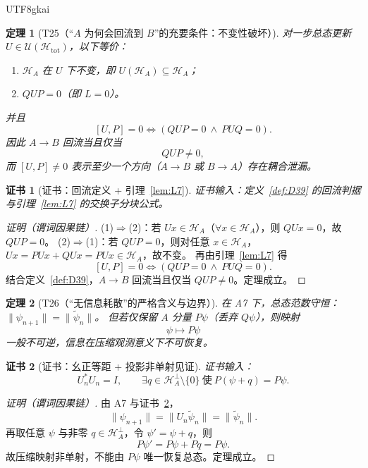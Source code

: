 \documentclass[12pt]{article}
\newtheorem{theorem}{定理}[section]
\newtheorem{Certificate}{证书}[section]
\begin{document}
\begin{CJK*}{UTF8}{gkai}
\begin{theorem}[T25（“$A$ 为何会回流到 $B$”的充要条件：不变性破坏）]
\label{thm:T25}
对一步总态更新 $U\in\mathcal U(\mathcal H_{\mathrm{tot}})$，以下等价：
\begin{enumerate}
\item $\mathcal H_A$ 在 $U$ 下不变，即 $U(\mathcal H_A)\subseteq \mathcal H_A$；
\item $QUP=0$（即 $L=0$）。
\end{enumerate}
并且
\[
[U,P]=0\Longleftrightarrow (QUP=0\ \wedge\ PUQ=0).
\]
因此 $A\to B$ 回流当且仅当
\[
QUP\neq 0,
\]
而 $[U,P]\neq 0$ 表示至少一个方向（$A\to B$ 或 $B\to A$）存在耦合泄漏。
\end{theorem}

\begin{Certificate}[证书：回流定义 + 引理~\ref{lem:L7}]
\label{cert:T25}
证书输入：定义~\ref{def:D39} 的回流判据与引理~\ref{lem:L7} 的交换子分块公式。
\end{Certificate}

\begin{proof}[证明（谓词因果链）]
(1)$\Rightarrow$(2)：若 $Ux\in\mathcal H_A$（$\forall x\in\mathcal H_A$），则 $QUx=0$，故 $QUP=0$。
(2)$\Rightarrow$(1)：若 $QUP=0$，则对任意 $x\in\mathcal H_A$，$Ux=PUx+QUx=PUx\in\mathcal H_A$，故不变。
再由引理~\ref{lem:L7} 得
\[
[U,P]=0\Longleftrightarrow (QUP=0\ \wedge\ PUQ=0).
\]
结合定义~\ref{def:D39}，$A\to B$ 回流当且仅当 $QUP\neq 0$。定理成立。
\end{proof}

\begin{theorem}[T26（“无信息耗散”的严格含义与边界）]
\label{thm:T26}
在 A7 下，总态范数守恒：$\|\psi_{n+1}\|=\|\tilde\psi_n\|$。
但若仅保留 $A$ 分量 $P\psi$（丢弃 $Q\psi$），则映射
\[
\psi\mapsto P\psi
\]
一般不可逆，信息在压缩观测意义下不可恢复。
\end{theorem}

\begin{Certificate}[证书：幺正等距 + 投影非单射见证]
\label{cert:T26}
证书输入：
\[
U_n^\ast U_n=I,\qquad
\exists q\in\mathcal H_A^\perp\setminus\{0\}\ \text{使}\ P(\psi+q)=P\psi.
\]
\end{Certificate}

\begin{proof}[证明（谓词因果链）]
由 A7 与证书~\ref{cert:T26}，
\[
\|\psi_{n+1}\|=\|U_n\tilde\psi_n\|=\|\tilde\psi_n\|.
\]
再取任意 $\psi$ 与非零 $q\in\mathcal H_A^\perp$，令 $\psi'=\psi+q$，则
\[
P\psi'=P\psi+Pq=P\psi.
\]
故压缩映射非单射，不能由 $P\psi$ 唯一恢复总态。定理成立。
\end{proof}


\end{CJK*}
\end{document}
